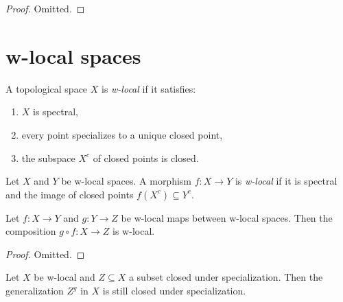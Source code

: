 \begin{proof}
  Omitted.
\end{proof}

\section{w-local spaces}

\begin{definition}
    \label{def:w-local-space}
    A topological space \(X\) is \emph{w-local} if it satisfies:
    \begin{enumerate}
        \item \(X\) is spectral,
        \item every point specializes to a unique closed point,
        \item the subspace \(X^c\) of closed points is closed.
    \end{enumerate}
\end{definition}

\begin{definition}
    Let \(X\) and \(Y\) be w-local spaces. A morphism \(f: X \to Y\) is \emph{w-local} if it is spectral and the image of closed points \(f(X^c) \subseteq Y^c\).
    \label{def:w-local-space-map}
    \leanok
\end{definition}

\begin{lemma}
  Let \(f: X \to Y\) and \(g: Y \to Z\) be w-local maps between w-local spaces. Then the composition \(g \circ f: X \to Z\) is w-local.
  \label{thm:w-local-map-composition}
\end{lemma}

\begin{proof}
  Omitted.
\end{proof}

\begin{lemma}
    Let $X$ be w-local and $Z \subseteq X$ a subset closed under specialization. Then the generalization
    $Z^g$ in $X$ is still closed under specialization.
    \label{lemma:generalization-specialization-closed}
\end{lemma}

